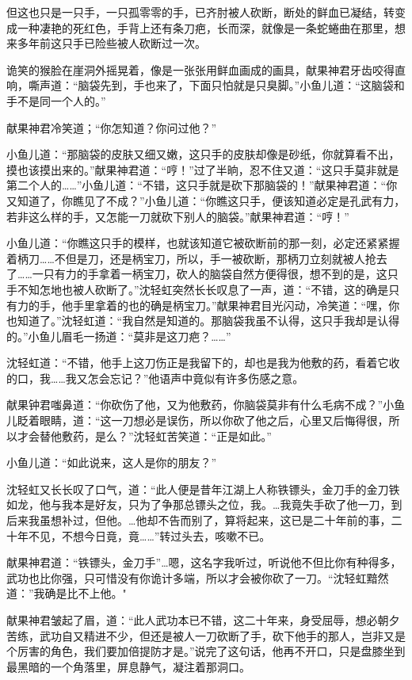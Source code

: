 \documentclass[12pt,oneside]{book}
\begin{document}
但这也只是一只手，一只孤零零的手，已齐肘被人砍断，断处的鲜血已凝结，转变成一种凄艳的死红色，手背上还有条刀疤，长而深，就像是一条蛇蜷曲在那里，想来多年前这只手已险些被人砍断过一次。

诡笑的猴脸在崖洞外摇晃着，像是一张张用鲜血画成的画具，献果神君牙齿咬得直响，嘶声道：``脑袋先到，手也来了，下面只怕就是只臭脚。''小鱼儿道：``这脑袋和手不是同一个人的。''

献果神君冷笑道；``你怎知道？你问过他？''

小鱼儿道：``那脑袋的皮肤又细又嫩，这只手的皮肤却像是砂纸，你就算看不出，摸也该摸出来的。''献果神君道：``哼！''过了半晌，忍不住又道：``这只手莫非就是第二个人的\ldots\ldots{}''小鱼儿道：``不错，这只手就是砍下那脑袋的！''献果神君道：``你又知道了，你瞧见了不成？''小鱼儿道：``你瞧这只手，便该知道必定是孔武有力，若非这么样的手，又怎能一刀就砍下别人的脑袋。''献果神君道：``哼！''

小鱼儿道：``你瞧这只手的模样，也就该知道它被砍断前的那一刻，必定还紧紧握着柄刀\ldots\ldots 不但是刀，还是柄宝刀，所以，手一被砍断，那柄刀立刻就被人抢去了\ldots\ldots 一只有力的手拿着一柄宝刀，砍人的脑袋自然方便得很，想不到的是，这只手不知怎地也被人砍断了。''沈轻虹突然长长叹息了一声，道：``不错，这的确是只有力的手，他手里拿着的也的确是柄宝刀。''献果神君目光闪动，冷笑道：``嘿，你也知道了。''沈轻虹道：``我自然是知道的。那脑袋我虽不认得，这只手我却是认得的。''小鱼儿眉毛一扬道：``莫非是这刀疤？\ldots\ldots{}''

沈轻虹道：``不错，他手上这刀伤正是我留下的，却也是我为他敷的药，看着它收的口，我\ldots\ldots 我又怎会忘记？''他语声中竟似有许多伤感之意。

献果钟君嗤鼻道：``你砍伤了他，又为他敷药，你脑袋莫非有什么毛病不成？''小鱼儿眨着眼睛，道：``这一刀想必是误伤，所以你砍了他之后，心里又后悔得很，所以才会替他敷药，是么？''沈轻虹苦笑道：``正是如此。''

小鱼儿道：``如此说来，这人是你的朋友？''

沈轻虹又长长叹了口气，道：``此人便是昔年江湖上人称铁镖头，金刀手的金刀铁如龙，他与我本是好友，只为了争那总镖头之位，我。\ldots 我竟失手砍了他一刀，到后来我虽想补过，但他。\ldots 他却不告而别了，算将起来，这已是二十年前的事，二十年不见，不想今日竟，竟\ldots\ldots{}''转过头去，咳嗽不已。

献果神君道：``铁镖头，金刀手''\ldots 嗯，这名字我听过，听说他不但比你有种得多，武功也比你强，只可惜没有你诡计多端，所以才会被你砍了一刀。``沈轻虹黯然道：''我确是比不上他。"

献果神君皱起了眉，道：``此人武功本已不错，这二十年来，身受屈辱，想必朝夕苦练，武功自又精进不少，但还是被人一刀砍断了手，砍下他手的那人，岂非又是个厉害的角色，我们要加倍提防才是。''说完了这句话，他再不开口，只是盘膝坐到最黑暗的一个角落里，屏息静气，凝注着那洞口。
\end{document}
